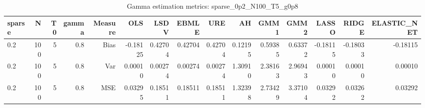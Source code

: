 \begin{table}[!htbp]\centering
\caption{Gamma estimation metrics: sparse_0p2_N100_T5_g0p8}
\label{tab:table1_sparse_0p2_N100_T5_g0p8}
\begin{tabular}{lrrrrrrrrrrrrrr}
\hline
sparse & N & T0 & gamma & Measure & OLS & LSDV & EBMLE & URE & AH & GMM1 & GMM2 & LASSO & RIDGE & ELASTIC_NET \\
\hline
0.2 & 100 & 5 & 0.8 & Bias & -0.18125 & 0.42704 & 0.42704 & 0.42704 & 0.12195 & 0.59385 & 0.63372 & -0.18115 & -0.18033 & -0.18115 \\
0.2 & 100 & 5 & 0.8 & Var & 0.00010 & 0.00274 & 0.00274 & 0.00274 & 1.30910 & 2.38163 & 2.96943 & 0.00010 & 0.00010 & 0.00010 \\
0.2 & 100 & 5 & 0.8 & MSE & 0.03295 & 0.18511 & 0.18511 & 0.18511 & 1.32398 & 2.73429 & 3.37104 & 0.03292 & 0.03262 & 0.03292 \\
\hline
\end{tabular}
\end{table}

